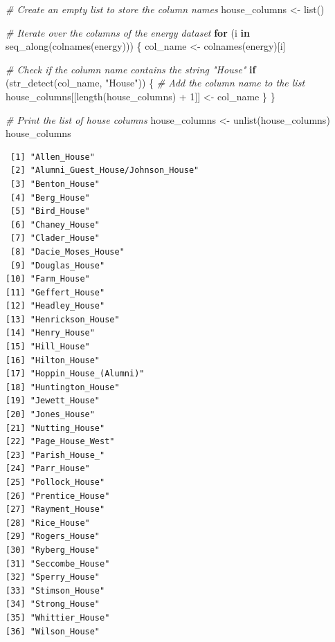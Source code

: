 \documentclass[
]{book}
\newenvironment{Shaded}{\begin{snugshade}}{\end{snugshade}}
\newcommand{\CommentTok}[1]{\textcolor[rgb]{0.56,0.35,0.01}{\textit{#1}}}
\newcommand{\ControlFlowTok}[1]{\textcolor[rgb]{0.13,0.29,0.53}{\textbf{#1}}}
\newcommand{\DecValTok}[1]{\textcolor[rgb]{0.00,0.00,0.81}{#1}}
\newcommand{\FunctionTok}[1]{\textcolor[rgb]{0.00,0.00,0.00}{#1}}
\newcommand{\NormalTok}[1]{#1}
\newcommand{\OtherTok}[1]{\textcolor[rgb]{0.56,0.35,0.01}{#1}}
\newcommand{\SpecialCharTok}[1]{\textcolor[rgb]{0.00,0.00,0.00}{#1}}
\newcommand{\StringTok}[1]{\textcolor[rgb]{0.31,0.60,0.02}{#1}}
\begin{document}
\begin{Shaded}
\begin{Highlighting}[]
\CommentTok{\# Create an empty list to store the column names}
\NormalTok{house\_columns }\OtherTok{\textless{}{-}} \FunctionTok{list}\NormalTok{()}

\CommentTok{\# Iterate over the columns of the \textquotesingle{}energy\textquotesingle{} dataset}
\ControlFlowTok{for}\NormalTok{ (i }\ControlFlowTok{in} \FunctionTok{seq\_along}\NormalTok{(}\FunctionTok{colnames}\NormalTok{(energy))) \{}
\NormalTok{  col\_name }\OtherTok{\textless{}{-}} \FunctionTok{colnames}\NormalTok{(energy)[i]}
  
  \CommentTok{\# Check if the column name contains the string "House"}
  \ControlFlowTok{if}\NormalTok{ (}\FunctionTok{str\_detect}\NormalTok{(col\_name, }\StringTok{"House"}\NormalTok{)) \{}
    \CommentTok{\# Add the column name to the list}
\NormalTok{    house\_columns[[}\FunctionTok{length}\NormalTok{(house\_columns) }\SpecialCharTok{+} \DecValTok{1}\NormalTok{]] }\OtherTok{\textless{}{-}}\NormalTok{ col\_name}
\NormalTok{  \}}
\NormalTok{\}}

\CommentTok{\# Print the list of house columns}
\NormalTok{house\_columns }\OtherTok{\textless{}{-}} \FunctionTok{unlist}\NormalTok{(house\_columns)}
\NormalTok{house\_columns}
\end{Highlighting}
\end{Shaded}

\begin{verbatim}
 [1] "Allen_House"                     
 [2] "Alumni_Guest_House/Johnson_House"
 [3] "Benton_House"                    
 [4] "Berg_House"                      
 [5] "Bird_House"                      
 [6] "Chaney_House"                    
 [7] "Clader_House"                    
 [8] "Dacie_Moses_House"               
 [9] "Douglas_House"                   
[10] "Farm_House"                      
[11] "Geffert_House"                   
[12] "Headley_House"                   
[13] "Henrickson_House"                
[14] "Henry_House"                     
[15] "Hill_House"                      
[16] "Hilton_House"                    
[17] "Hoppin_House_(Alumni)"           
[18] "Huntington_House"                
[19] "Jewett_House"                    
[20] "Jones_House"                     
[21] "Nutting_House"                   
[22] "Page_House_West"                 
[23] "Parish_House_"                   
[24] "Parr_House"                      
[25] "Pollock_House"                   
[26] "Prentice_House"                  
[27] "Rayment_House"                   
[28] "Rice_House"                      
[29] "Rogers_House"                    
[30] "Ryberg_House"                    
[31] "Seccombe_House"                  
[32] "Sperry_House"                    
[33] "Stimson_House"                   
[34] "Strong_House"                    
[35] "Whittier_House"                  
[36] "Wilson_House"                    
\end{verbatim}
\end{document}
